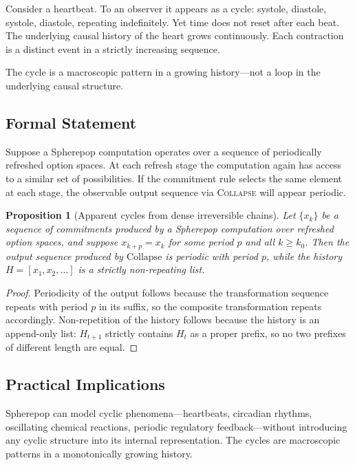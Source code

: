 \documentclass[12pt]{article}
\newtheorem{proposition}{Proposition}[section]
\begin{document}
Consider a heartbeat. To an observer it appears as a cycle: systole, diastole, systole, diastole, repeating indefinitely. Yet time does not reset after each beat. The underlying causal history of the heart grows continuously. Each contraction is a distinct event in a strictly increasing sequence.

The cycle is a macroscopic pattern in a growing history---not a loop in the underlying causal structure.

\subsection{Formal Statement}

Suppose a Spherepop computation operates over a sequence of periodically refreshed option spaces. At each refresh stage the computation again has access to a similar set of possibilities. If the commitment rule selects the same element at each stage, the observable output sequence via \textsc{Collapse} will appear periodic.

\begin{proposition}[Apparent cycles from dense irreversible chains]
Let $\{x_k\}$ be a sequence of commitments produced by a Spherepop computation over refreshed option spaces, and suppose $x_{k+p} = x_k$ for some period $p$ and all $k \geq k_0$. Then the output sequence produced by $\mathrm{Collapse}$ is periodic with period $p$, while the history $H = [x_1, x_2, \ldots]$ is a strictly non-repeating list.
\end{proposition}

\begin{proof}
Periodicity of the output follows because the transformation sequence repeats with period $p$ in its suffix, so the composite transformation repeats accordingly. Non-repetition of the history follows because the history is an append-only list: $H_{t+1}$ strictly contains $H_t$ as a proper prefix, so no two prefixes of different length are equal.
\end{proof}

\subsection{Practical Implications}

Spherepop can model cyclic phenomena---heartbeats, circadian rhythms, oscillating chemical reactions, periodic regulatory feedback---without introducing any cyclic structure into its internal representation. The cycles are macroscopic patterns in a monotonically growing history.
\end{document}
